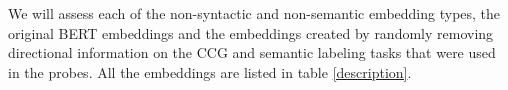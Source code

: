 \documentclass[11pt,a4paper]{article}
\begin{document}

We will assess each of the non-syntactic and non-semantic embedding types, the original BERT embeddings and the embeddings created by randomly removing directional information on the CCG and semantic labeling tasks that were used in the probes.  All the embeddings are listed in table \ref{description}.


\end{document}
